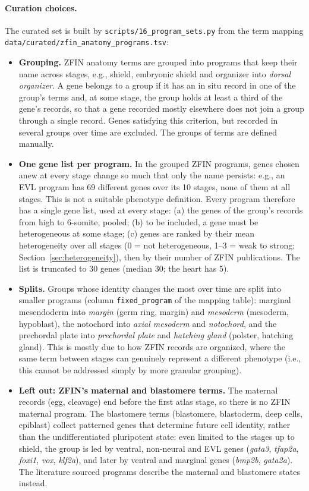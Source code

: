 \documentclass[11pt,a4paper]{article}
\begin{document}
\paragraph{Curation choices.} The curated set is built by \nolinkurl{scripts/16_program_sets.py} from the term mapping \nolinkurl{data/curated/zfin_anatomy_programs.tsv}:
\begin{itemize}
	\item \textbf{Grouping.} ZFIN anatomy terms are grouped into programs that keep their name across stages, e.g., shield, embryonic shield and organizer into \emph{dorsal organizer}. A gene belongs to a group if it has an in situ record in one of the group's terms and, at some stage, the group holds at least a third of the gene's records, so that a gene recorded mostly elsewhere does not join a group through a single record. Genes satisfying this criterion, but recorded in several groups over time are excluded. The groups of terms are defined manually.
	\item \textbf{One gene list per program.} In the grouped ZFIN programs, genes chosen anew at every stage change so much that only the name persists: e.g., an EVL program has 69 different genes over its 10 stages, none of them at all stages. This is not a suitable phenotype definition. Every program therefore has a single gene list, used at every stage: (a) the genes of the group's records from high to 6-somite, pooled; (b) to be included, a gene must be heterogeneous at some stage; (c) genes are ranked by their mean heterogeneity over all stages (0 = not heterogeneous, 1--3 = weak to strong; Section~\ref{sec:heterogeneity}), then by their number of ZFIN publications. The list is truncated to 30 genes (median 30; the heart has 5). 
	\item \textbf{Splits.} Groups whose identity changes the most over time are split into smaller programs (column \texttt{fixed\_program} of the mapping table): marginal mesendoderm into \emph{margin} (germ ring, margin) and \emph{mesoderm} (mesoderm, hypoblast), the notochord into \emph{axial mesoderm} and \emph{notochord}, and the prechordal plate into \emph{prechordal plate} and \emph{hatching gland} (polster, hatching gland). This is mostly due to how ZFIN records are organized, where the same term between stages can genuinely represent a different phenotype (i.e., this cannot be addressed simply by more granular grouping).
	\item \textbf{Left out: ZFIN's maternal and blastomere terms.} The maternal records (egg, cleavage) end before the first atlas stage, so there is no ZFIN maternal program. The blastomere terms (blastomere, blastoderm, deep cells, epiblast) collect patterned genes that determine future cell identity, rather than the undifferentiated pluripotent state: even limited to the stages up to shield, the group is led by ventral, non-neural and EVL genes (\emph{gata3}, \emph{tfap2a}, \emph{foxi1}, \emph{vox}, \emph{klf2a}), and later by ventral and marginal genes (\emph{bmp2b}, \emph{gata2a}). The literature sourced programs describe the maternal and blastomere states instead.

\end{itemize}
\end{document}
